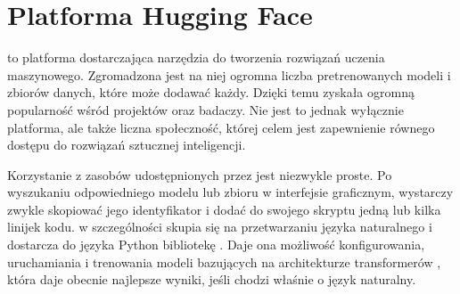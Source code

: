 \section{Platforma Hugging Face}
 to platforma dostarczająca narzędzia do tworzenia rozwiązań uczenia maszynowego. Zgromadzona jest na niej ogromna liczba pretrenowanych modeli i zbiorów danych, które może dodawać każdy. Dzięki temu zyskała ogromną popularność wśród projektów  oraz badaczy. Nie jest to jednak wyłącznie platforma, ale także liczna społeczność, której celem jest zapewnienie równego dostępu do rozwiązań sztucznej inteligencji.

Korzystanie z zasobów udostępnionych przez  jest niezwykle proste. Po wyszukaniu odpowiedniego modelu lub zbioru w interfejsie graficznym, wystarczy zwykle skopiować jego identyfikator i dodać do swojego skryptu jedną lub kilka linijek kodu.  w szczególności skupia się na przetwarzaniu języka naturalnego i dostarcza do języka Python bibliotekę . Daje ona możliwość konfigurowania, uruchamiania i trenowania modeli bazujących na architekturze transformerów , która daje obecnie najlepsze wyniki, jeśli chodzi właśnie o język naturalny. 
